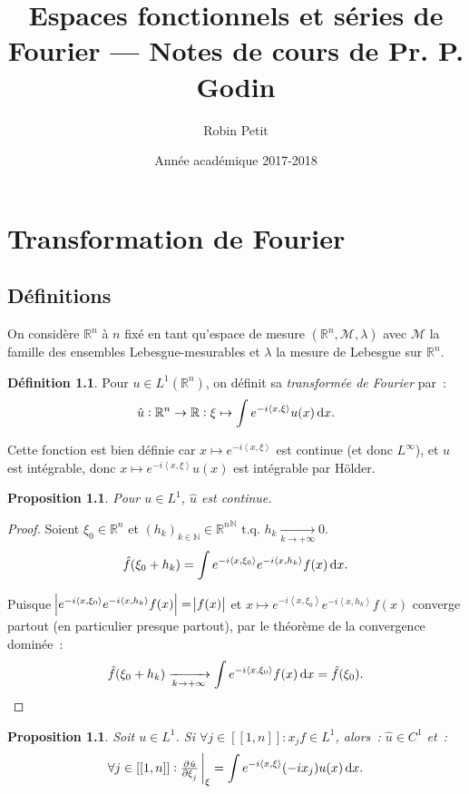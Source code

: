 \documentclass{report}
\title{Espaces fonctionnels et séries de Fourier --- Notes de cours de Pr. P. Godin}
\author{Robin Petit}
\date{Année académique 2017-2018}
\newcommand{\R}{{\mathbb R}}
\newcommand{\N}{{\mathbb N}}
\newcommand{\scpr}[2]{\left\langle#1, #2\right\rangle}
\newcommand{\tq}{\text{ t.q. }}
\newcommand{\pinfty}{{+\infty}}
\newcommand{\intint}[2]{{[[#1, #2]]}}
\newtheorem{prp}[thm]{Proposition}
\theoremstyle{definition}
\newtheorem{déf}[thm]{Définition}
\theoremstyle{remark}
\begin{document}
\maketitle
\tableofcontents
\setcounter{page}{1}

\chapter{Transformation de Fourier}

\section{Définitions}

On considère $\R^n$ à $n$ fixé en tant qu'espace de mesure $(\R^n, \mathcal M, \lambda)$ avec $\mathcal M$ la famille des ensembles Lebesgue-mesurables et $\lambda$
la mesure de Lebesgue sur $\R^n$.

\begin{déf} Pour $u \in L^1(\R^n)$, on définit sa \textit{transformée de Fourier} par~:
\begin{equation}
	\hat u : \R^n \to \R : \xi \mapsto \int e^{-i\scpr x\xi}u(x)\dif x.
\end{equation}
\end{déf}

Cette fonction est bien définie car $x \mapsto e^{-i\scpr x\xi}$ est continue (et donc $L^\infty$), et $u$ est intégrable, donc $x \mapsto e^{-i\scpr x\xi}u(x)$ est intégrable
par Hölder.

\begin{prp} Pour $u \in L^1$, $\hat u$ est continue.
\end{prp}

\begin{proof} Soient $\xi_0 \in \R^n$ et $(h_k)_{k \in \N} \in {\R^n}^\N \tq h_k \xrightarrow[k \to \pinfty]{} 0$.
\[\hat f(\xi_0 + h_k) = \int e^{-i\scpr x{\xi_0}}e^{-i\scpr x{h_k}}f(x)\dif x.\]

Puisque $\abs {e^{-i\scpr x{\xi_0}}e^{-i\scpr x{h_k}}f(x)} = \abs {f(x)}$ et $x \mapsto e^{-i\scpr x{\xi_0}}e^{-i\scpr x{h_k}}f(x)$ converge partout
(en particulier presque partout), par le théorème de la convergence dominée~:
\[\hat f(\xi_0 + h_k) \xrightarrow[k \to \pinfty]{} \int e^{-i\scpr x{\xi_0}}f(x)\dif x = \hat f(\xi_0).\]
\end{proof}

\begin{prp} Soit $u \in L^1$. Si $\forall j \in \intint 1n : x_jf \in L^1$, alors~: $\hat u \in C^1$ et~:
\begin{equation}\label{eq:pd transformée Fourier}
	\forall j \in \intint 1n : \pd {\hat u}{\xi_j}\sVert[3]_\xi = \int e^{-i\scpr x\xi}(-ix_j)u(x)\dif x.
\end{equation}
\end{prp}
\end{document}
